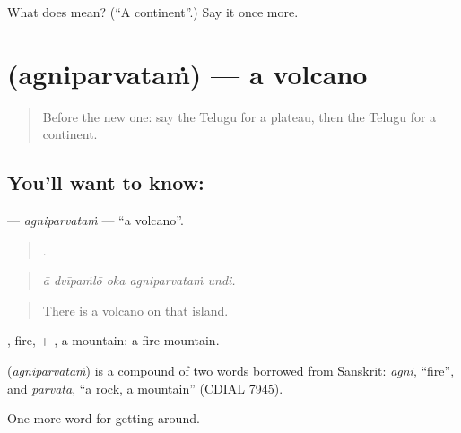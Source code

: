 \begin{tcolorbox}[breakable,colback=teal!4,colframe=teal!35!black,title={Before you move on}]
What does  mean? (\textquotedblleft{}A continent\textquotedblright{}.) Say it once more.
\end{tcolorbox}
\section[\texorpdfstring{\te{అగ్నిపర్వతం} (agniparvataṁ)}{అగ్నిపర్వతం (agniparvataṁ)}]{ (agniparvataṁ) — a volcano}

\label{lesson:TE-C474-agniparvatam}



\begin{quote}
Before the new one: say the Telugu for a plateau, then the Telugu for a continent.
\end{quote}

\subsection*{You'll want to know: }
\textbf{} — \emph{agniparvataṁ} — \textquotedblleft{}a volcano\textquotedblright{}.

\begin{quote}
    .
\end{quote}

\begin{quote}
\emph{ā dvīpaṁlō oka agniparvataṁ undi.}
\end{quote}

\begin{quote}
There is a volcano on that island.
\end{quote}

, fire, + , a mountain: a fire mountain.

\begin{cousinweb}
\textbf{} (\emph{agniparvataṁ}) is a compound of two words borrowed from Sanskrit: \emph{agni}, \textquotedblleft{}fire\textquotedblright{}, and \emph{parvata}, \textquotedblleft{}a rock, a mountain\textquotedblright{} (CDIAL 7945).
\end{cousinweb}

\begin{grammarlens}[title={What you've built}]
One more word for getting around.
\end{grammarlens}

